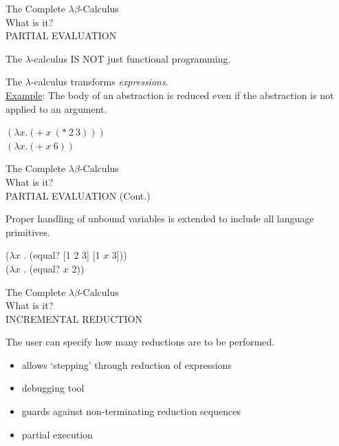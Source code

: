 \begin{slide}{}
\begin{center}
The Complete $\lambda\beta$-Calculus\\
What is it?\\[2em]
PARTIAL EVALUATION
\end{center}

\begin{flushleft}
The $\lambda$-calculus IS NOT just functional programming.

The $\lambda$-calculus transforms {\em expressions}.\\[1in]



\underline{Example}:
The body of an abstraction is reduced even if the abstraction is
not applied to an argument.
\end{flushleft}
\begin{center}
	$(\lambda x . (+ \ x \ (* \ 2 \ 3)))$ \red\\

	$(\lambda x . (+ \ x \ 6))$
\end{center}
\end{slide}

\begin{slide}{}
\begin{center}
The Complete $\lambda\beta$-Calculus\\
What is it?\\[2em]
PARTIAL EVALUATION (Cont.)
\end{center}
\vspace*{1.5in}
\begin{flushleft}
Proper handling of unbound variables is extended to include 
all language primitives.
\end{flushleft}
\begin{center}
	($\lambda x$ . (equal? [1 2 3] [1 $x$ 3])) \red\\

	($\lambda x$ . (equal? $x$ 2))
\end{center}
\end{slide}


\begin{slide}{}
\begin{center}
The Complete $\lambda\beta$-Calculus\\
What is it?\\[2em]
INCREMENTAL REDUCTION\\[1in]
\end{center}

\begin{flushleft}
The user can specify how many reductions are to be performed.
\end{flushleft}
\begin {itemize}
	\item allows `stepping' through reduction of expressions
	\item debugging tool
	\item guards against non-terminating reduction sequences
	\item partial execution
\end{itemize}
\end{slide}



